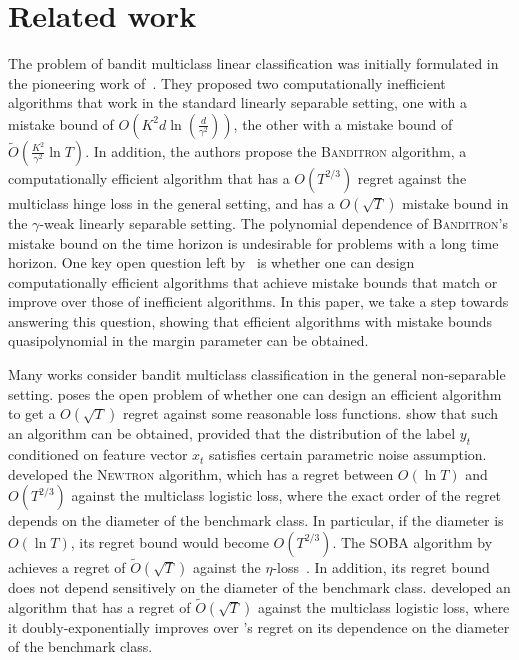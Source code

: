 \section{Related work}
\label{section:related-work}

The problem of bandit multiclass linear classification was initially formulated
in the pioneering work of~\citet{Kakade-Shalev-Shwartz-Tewari-2008}. They proposed
two computationally inefficient algorithms that work in the standard
linearly separable setting, one with a mistake bound of $O(K^2 d
\ln(\frac{d}{\gamma^2}))$, the other with a mistake bound of
$\widetilde{O}(\frac{K^2}{\gamma^2} \ln T)$. In addition, the authors propose
the \textsc{Banditron} algorithm, a computationally efficient algorithm that has
a $O(T^{2/3})$ regret against the multiclass hinge loss in the general setting,
and has a $O(\sqrt{T})$ mistake bound in the $\gamma$-weak linearly separable
setting. The polynomial dependence of \textsc{Banditron}'s mistake bound on the
time horizon is undesirable for problems with a long time horizon. One key open
question left by~\citet{Kakade-Shalev-Shwartz-Tewari-2008} is whether one can
design computationally efficient algorithms that achieve mistake bounds that
match or improve over those of inefficient algorithms. In this paper, we take a
step towards answering this question, showing that efficient algorithms with
mistake bounds quasipolynomial in the margin parameter can be obtained.


Many works consider bandit multiclass classification in the general
non-separable setting. \citet{Abernethy-Rakhlin-2009} poses the open problem of
whether one can design an efficient algorithm to get a $O(\sqrt{T})$ regret
against some reasonable loss functions. \citet{Crammer-Gentile-2013} show that
such an algorithm can be obtained, provided that the distribution of the label
$y_t$ conditioned on feature vector $x_t$ satisfies certain parametric noise
assumption. \citet{Hazan-Kale-2011} developed the \textsc{Newtron} algorithm,
which has a regret between $O(\ln T)$ and $O(T^{2/3})$ against the multiclass
logistic loss, where the exact order of the regret depends on the diameter of
the benchmark class. In particular, if the diameter is $O(\ln T)$, its regret
bound would become $O(T^{2/3})$. The \textsc{SOBA} algorithm by
\citet{Beygelzimer-Orabona-Zhang-2017} achieves a regret of
$\widetilde{O}(\sqrt{T})$ against the
$\eta$-loss~\citet{Orabona-Cesa-Bianchi-Gentile-2012}. In addition, its regret
bound does not depend sensitively on the diameter of the benchmark class.
\citet{Foster-Kale-Luo-Mohri-Sridharan-2018} developed an algorithm that has a
regret of $\widetilde{O}(\sqrt{T})$ against the multiclass logistic loss, where
it doubly-exponentially improves over \citet{Hazan-Kale-2011}'s regret on its
dependence on the diameter of the benchmark class.

